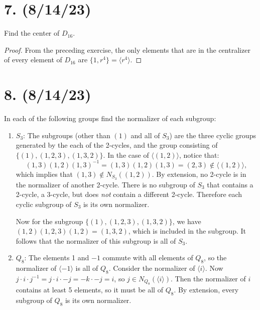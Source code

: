 \documentclass{article}
\begin{document}
\section*{7. (8/14/23)}

Find the center of $D_{16}$.

\begin{proof}
    From the preceding exercise, the only elements that are in the centralizer of every element of $D_{16}$ are $\{ 1, r^4 \} = \langle r^4 \rangle$.
\end{proof}

\section*{8. (8/14/23)}

In each of the following groups find the normalizer of each subgroup:

\begin{enumerate}[label=(\alph*), itemsep=0em]
    \item $S_3$: The subgroups (other than $(1)$ and all of $S_3$) are the three cyclic groups generated by the each of the 2-cycles, and the group consisting of $\{ (1), (1, 2, 3), (1, 3, 2) \}$. In the case of $\langle (1, 2) \rangle$, notice that:
    \begin{equation*}
        (1, 3)(1, 2)(1, 3)^{-1} = (1, 3)(1, 2)(1, 3) = (2, 3) \notin \langle (1, 2) \rangle,
    \end{equation*}
    which implies that $(1, 3) \notin N_{S_3}((1, 2))$. By extension, no 2-cycle is in the normalizer of another 2-cycle. There is no subgroup of $S_3$ that contains a 2-cycle, a 3-cycle, but does \emph{not} contain a different 2-cycle. Therefore each cyclic subgroup of $S_3$ is its own normalizer.

    Now for the subgroup $\{ (1), (1, 2, 3), (1, 3, 2) \}$, we have $(1, 2)(1, 2, 3)(1, 2) = (1, 3, 2)$, which is included in the subgroup. It follows that the normalizer of this subgroup is all of $S_3$.
    \item $Q_8$: The elements 1 and $-1$ commute with all elements of $Q_8$, so the normalizer of $\langle -1 \rangle$ is all of $Q_8$. Consider the normalizer of $\langle i \rangle$. Now $j \cdot i \cdot j^{-1} = j \cdot i \cdot -j = -k \cdot -j = i$, so $j \in N_{Q_8}(\langle i \rangle)$. Then the normalizer of $i$ contains at least 5 elements, so it must be all of $Q_8$. By extension, every subgroup of $Q_8$ is its own normalizer.
\end{enumerate}
\end{document}
